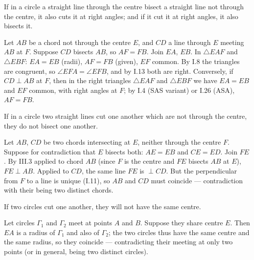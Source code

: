 \documentclass{rrxiv}
\begin{document}
\begin{claim}
\label{prop:III.3}
If in a circle a straight line through the centre bisect a straight
line not through the centre, it also cuts it at right angles; and if
it cut it at right angles, it also bisects it.
\end{claim}
\begin{evidence}
\label{ev:III.3}
Let $AB$ be a chord not through the centre $E$, and $CD$ a line
through $E$ meeting $AB$ at $F$.  Suppose $CD$ bisects $AB$, so
$AF = FB$.  Join $EA$, $EB$.  In $\triangle EAF$ and $\triangle
EBF$: $EA = EB$ (radii), $AF = FB$ (given), $EF$ common.  By I.8 the
triangles are congruent, so $\angle EFA = \angle EFB$, and by I.13
both are right.  Conversely, if $CD \perp AB$ at $F$, then in the
right triangles $\triangle EAF$ and $\triangle EBF$ we have $EA =
EB$ and $EF$ common, with right angles at $F$; by I.4 (SAS variant)
or I.26 (ASA), $AF = FB$.
\end{evidence}

\begin{claim}
\label{prop:III.4}
If in a circle two straight lines cut one another which are not
through the centre, they do not bisect one another.
\end{claim}
\begin{evidence}
\label{ev:III.4}
Let $AB$, $CD$ be two chords intersecting at $E$, neither through
the centre $F$.  Suppose for contradiction that $E$ bisects both:
$AE = EB$ and $CE = ED$.  Join $FE$.  By III.3 applied to chord
$AB$ (since $F$ is the centre and $FE$ bisects $AB$ at $E$), $FE
\perp AB$.  Applied to $CD$, the same line $FE$ is $\perp CD$.  But
the perpendicular from $F$ to a line is unique (I.11), so $AB$ and
$CD$ must coincide --- contradiction with their being two distinct
chords.
\end{evidence}

\begin{claim}
\label{prop:III.5}
If two circles cut one another, they will not have the same centre.
\end{claim}
\begin{evidence}
\label{ev:III.5}
Let circles $\Gamma_1$ and $\Gamma_2$ meet at points $A$ and $B$.
Suppose they share centre $E$.  Then $EA$ is a radius of $\Gamma_1$
and also of $\Gamma_2$; the two circles thus have the same centre
and the same radius, so they coincide --- contradicting their
meeting at only two points (or in general, being two distinct
circles).
\end{evidence}
\end{document}
